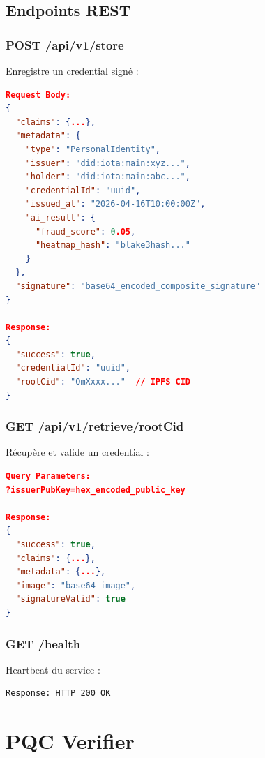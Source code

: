 \documentclass[12pt,a4paper]{report}
\begin{document}
\subsection{Endpoints REST}

\subsubsection{POST /api/v1/store}

Enregistre un credential signé :

\begin{lstlisting}[language=json]
Request Body:
{
  "claims": {...},
  "metadata": {
    "type": "PersonalIdentity",
    "issuer": "did:iota:main:xyz...",
    "holder": "did:iota:main:abc...",
    "credentialId": "uuid",
    "issued_at": "2026-04-16T10:00:00Z",
    "ai_result": {
      "fraud_score": 0.05,
      "heatmap_hash": "blake3hash..."
    }
  },
  "signature": "base64_encoded_composite_signature"
}

Response:
{
  "success": true,
  "credentialId": "uuid",
  "rootCid": "QmXxxx..."  // IPFS CID
}
\end{lstlisting}

\subsubsection{GET /api/v1/retrieve/{rootCid}}

Récupère et valide un credential :

\begin{lstlisting}[language=json]
Query Parameters:
?issuerPubKey=hex_encoded_public_key

Response:
{
  "success": true,
  "claims": {...},
  "metadata": {...},
  "image": "base64_image",
  "signatureValid": true
}
\end{lstlisting}

\subsubsection{GET /health}

Heartbeat du service :

\begin{lstlisting}
Response: HTTP 200 OK
\end{lstlisting}

\section{PQC Verifier}
\end{document}
